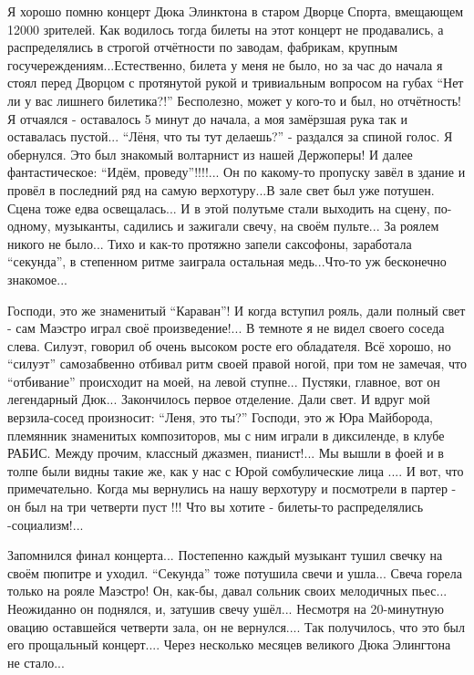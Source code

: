 \begin{itemize}
\begin{itemize}
Я хорошо помню концерт Дюка Элинктона в старом Дворце Спорта, вмещающем 12000
зрителей. Как водилось тогда билеты на этот концерт не продавались, а
распределялись в строгой отчётности по заводам, фабрикам, крупным
госучереждениям...Естественно, билета у меня не было, но за час до начала я
стоял перед Дворцом с протянутой рукой и тривиальным вопросом на губах \enquote{Нет ли
у вас лишнего билетика?!} Бесполезно, может у кого-то и был, но отчётность! Я
отчаялся - оставалось 5 минут до начала, а моя замёрзшая рука так и оставалась
пустой... \enquote{Лёня, что ты тут делаешь?} - раздался за спиной голос. Я обернулся.
Это был знакомый волтарнист из нашей Держоперы! И далее фантастическое: \enquote{Идём,
проведу}!!!!... Он по какому-то пропуску завёл в здание и провёл в последний
ряд на самую верхотуру...В зале свет был уже потушен. Сцена тоже едва
освещалась... И в этой полутьме стали выходить на сцену, по-одному, музыканты,
садились и зажигали свечу, на своём пульте... За роялем никого не было... Тихо и
как-то протяжно запели саксофоны, заработала \enquote{секунда}, в степенном ритме
заиграла остальная медь...Что-то уж бесконечно знакомое...

Господи, это же знаменитый \enquote{Караван}! И когда вступил рояль, дали полный свет -
сам Маэстро играл своё произведение!... В темноте я не видел своего соседа
слева. Силуэт, говорил об очень высоком росте его обладателя. Всё хорошо,
но \enquote{силуэт} самозабвенно отбивал ритм своей правой ногой, при том не замечая,
что \enquote{отбивание} происходит на моей, на левой ступне... Пустяки, главное, вот он
легендарный Дюк... Закончилось первое отделение. Дали свет. И вдруг мой
верзила-сосед произносит: \enquote{Леня, это ты?} Господи, это ж Юра Майборода,
племянник знаменитых композиторов, мы с ним играли в диксиленде, в клубе РАБИС.
Между прочим, классный джазмен, пианист!... Мы вышли в фоей и в толпе были видны
такие же, как у нас с Юрой сомбулические лица .... И вот, что примечательно.
Когда мы вернулись на нашу верхотуру и посмотрели в партер - он был на три
четверти пуст !!! Что вы хотите - билеты-то распределялись -социализм!...

Запомнился финал концерта... Постепенно каждый музыкант тушил свечку на своём
пюпитре и уходил. \enquote{Секунда} тоже потушила свечи и ушла... Свеча горела только
на рояле Маэстро! Он, как-бы, давал сольник своих мелодичных пьес... Неожиданно
он поднялся, и, затушив свечу ушёл... Несмотря на 20-минутную овацию оставшейся
четверти зала, он не вернулся.... Так получилось, что это был его прощальный
концерт.... Через несколько месяцев великого Дюка Элингтона не стало...



\end{itemize}
\end{itemize}
